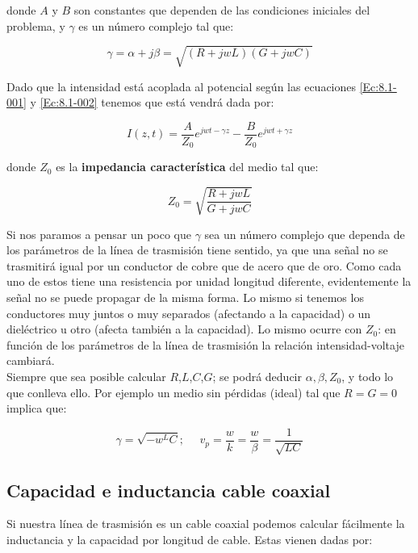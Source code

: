 \documentclass[12pt]{article}
\begin{document}
donde $A$ y $B$ son constantes que dependen de las condiciones iniciales del problema, y $\gamma$ es un número complejo tal que:

\begin{equation}
\gamma = \alpha + j \beta = \sqrt{(R+jwL)(G+jwC)}
\end{equation}

Dado que la intensidad está acoplada al potencial según las ecuaciones  \ref{Ec:8.1-001} y \ref{Ec:8.1-002} tenemos que está vendrá dada por:

\begin{equation}
I(z,t) = \dfrac{A}{Z_0} e^{jwt-\gamma z} - \dfrac{B}{Z_0} e^{jwt+\gamma z}
\end{equation}
 
donde $Z_0$ es la \textbf{impedancia característica} del medio tal que:

\begin{equation}
Z_0 = \sqrt{\dfrac{R+jwL}{G+jwC}}
\end{equation}
 
Si nos paramos a pensar un poco que $\gamma$ sea un número complejo que dependa de los parámetros de la línea de trasmisión tiene sentido, ya que una señal no se trasmitirá igual por un conductor de cobre que de acero que de oro. Como cada uno de estos tiene una resistencia por unidad longitud diferente, evidentemente la señal no se puede propagar de la misma forma. Lo mismo si tenemos los conductores muy juntos o muy separados (afectando a la capacidad) o un dieléctrico u otro (afecta también a la capacidad). Lo mismo ocurre con $Z_0$: en función de los parámetros de la línea de trasmisión la relación intensidad-voltaje cambiará. \\

Siempre que sea posible calcular $R$,$L$,$C$,$G$; se podrá deducir $\alpha,\beta,Z_0$, y todo lo que conlleva ello. Por ejemplo un medio sin pérdidas (ideal) tal que $R=G=0$ implica que:

\begin{equation}
\gamma = \sqrt{-w^LC}; \ \ \ \ \ \ v_p = \dfrac{w}{k} = \dfrac{w}{\beta} = \dfrac{1}{\sqrt{LC}}
\end{equation}

\subsection{Capacidad e inductancia cable coaxial}

Si nuestra línea de trasmisión es un cable coaxial podemos calcular fácilmente la inductancia y la capacidad por longitud de cable. Estas vienen dadas por:
\end{document}
